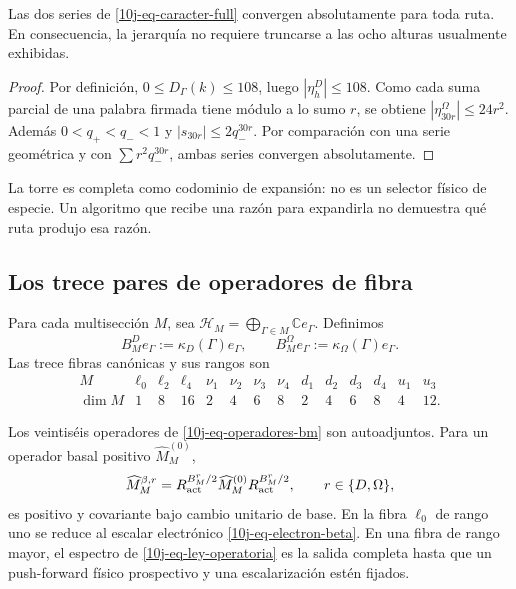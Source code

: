 \begin{proposition}
\label{10j-prop-convergencia-torres}
Las dos series de \eqref{10j-eq-caracter-full} convergen absolutamente para
toda ruta. En consecuencia, la jerarquía no requiere truncarse a las ocho
alturas usualmente exhibidas.
\end{proposition}

\begin{proof}
Por definición, \(0\le D_\Gamma(k)\le108\), luego
\(|\eta_h^D|\le108\). Como cada suma parcial de una palabra firmada tiene
módulo a lo sumo \(r\), se obtiene
\(|\eta_{30r}^\Omega|\le24r^2\). Además
\(0<q_+<q_-<1\) y
\(|s_{30r}|\le2q_-^{30r}\). Por comparación con una serie geométrica y con
\(\sum r^2q_-^{30r}\), ambas series convergen absolutamente.
\end{proof}

La torre es completa como codominio de expansión: no es un selector físico
de especie. Un algoritmo que recibe una razón para expandirla no demuestra
qué ruta produjo esa razón.

\subsection{Los trece pares de operadores de fibra}

Para cada multisección \(M\), sea
\(
 \mathcal H_M=\bigoplus_{\Gamma\in M}\mathbb C e_\Gamma
\). Definimos
\begin{equation}
 B_M^D e_\Gamma:=\kappa_D(\Gamma)e_\Gamma,
 \qquad
 B_M^\Omega e_\Gamma:=\kappa_\Omega(\Gamma)e_\Gamma.
 \label{10j-eq-operadores-bm}
\end{equation}
Las trece fibras canónicas y sus rangos son
\begin{equation}
 \begin{array}{c|ccccccccccccc}
 M&\ell_0&\ell_2&\ell_4&\nu_1&\nu_2&\nu_3&\nu_4
  &d_1&d_2&d_3&d_4&u_1&u_3\\ \hline
 \dim M&1&8&16&2&4&6&8&2&4&6&8&4&12.
 \end{array}
 \label{10j-eq-trece-fibras}
\end{equation}

\begin{theorem}
\label{10j-thm-ley-operatoria}
Los veintiséis operadores de \eqref{10j-eq-operadores-bm} son
autoadjuntos. Para un operador basal positivo
\(\widehat M_M^{(0)}\),
\begin{equation}
 \widehat M_M^{\beta,r}
 =R_{\rm act}^{B_M^r/2}
  \widehat M_M^{(0)}
  R_{\rm act}^{B_M^r/2},
 \qquad r\in\{D,\Omega\},
 \label{10j-eq-ley-operatoria}
\end{equation}
es positivo y covariante bajo cambio unitario de base. En la fibra
\(\ell_0\) de rango uno se reduce al escalar electrónico
\eqref{10j-eq-electron-beta}. En una fibra de rango mayor, el espectro de
\eqref{10j-eq-ley-operatoria} es la salida completa hasta que un
push-forward físico prospectivo y una escalarización estén fijados.
\end{theorem}

